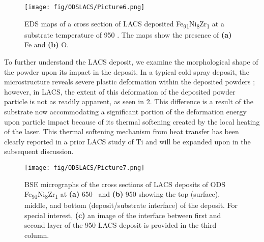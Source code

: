 				\begin{figure}
					\centering
					\texttt{[image: fig/ODSLACS/Picture6.png]}
					\caption[EDS maps of a cross section of LACS deposited Fe\textsubscript{91}Ni\textsubscript{8}Zr\textsubscript{1 }at a substrate temperature of 950 \celsius{}.]{EDS maps of a cross section of LACS deposited Fe\textsubscript{91}Ni\textsubscript{8}Zr\textsubscript{1 }at a substrate temperature of 950 \celsius{}. The maps show the presence of \textbf{(a)} Fe and \textbf{(b)} O.}
					\label{fig:ODSLACS6}
				\end{figure}






	To further understand the LACS deposit, we examine the morphological shape of the powder upon its impact in the deposit. In a typical cold spray deposit, the microstructure reveals severe plastic deformation within the deposited powders \cite{RN486}; however, in LACS, the extent of this deformation of the deposited powder particle is not as readily apparent, as seen in \ref{fig:ODSLACS7}. This difference is a result of the substrate now accommodating a significant portion of the deformation energy upon particle impact because of its thermal softening created by the local heating of the laser. This thermal softening mechanism from heat transfer has been clearly reported in a prior LACS study of Ti \cite{RN173} and will be expanded upon in the subsequent discussion. 


				\begin{figure}
					\centering
					\texttt{[image: fig/ODSLACS/Picture7.png]}
					\caption[BSE micrographs of the cross sections of LACS deposits of ODS Fe\textsubscript{91}Ni\textsubscript{8}Zr\textsubscript{1 }at \textbf{(a)} 650 \celsius{} and \textbf{(b) }950 \celsius{} showing the top (surface), middle, and bottom (deposit/substrate interface) of the deposit.]{BSE micrographs of the cross sections of LACS deposits of ODS Fe\textsubscript{91}Ni\textsubscript{8}Zr\textsubscript{1 }at \textbf{(a)} 650 \celsius{} and \textbf{(b) }950 \celsius{} showing the top (surface), middle, and bottom (deposit/substrate interface) of the deposit. For special interest, \textbf{(c)} an image of the interface between first and second layer of the 950 \celsius{} LACS deposit is provided in the third column.}
					\label{fig:ODSLACS7}
				\end{figure}




